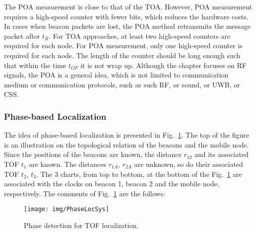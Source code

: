 The POA measurement is close to that of the TOA. However, POA measurement requires a high-speed counter with fewer bits, which reduces the hardware costs. In cases when beacon packets are lost, the POA method retransmits the message packet after $t_R$.
    For TOA approaches, at least two high-speed counters are required for each node. For POA measurement, only one high-speed counter is required for each node. The length of the counter should be long enough such that within the time $t_{OF}$ it is not wrap up.
    Although the chapter focuses on RF signals, the POA is a general idea, which is not limited to communication medium or communication protocols, such as such RF, or sound, or UWB, or CSS.

\subsubsection{Phase-based Localization}
The idea of phase-based localization is presented in Fig.~\ref{f:tof}.
    The top of the figure is an illustration on the topological relation of the beacons and the mobile node. Since the positions of the beacons are known, the distance $r_{12}$ and its associated TOF $t_1$ are known. The distances $r_{1A}$, $r_{2A}$ are unknown, so do their associated TOF $t_2$, $t_3$. The 3 charts, from top to bottom, at the bottom of the Fig.~\ref{f:tof} are associated with the clocks on beacon 1, beacon 2 and the mobile node, respectively.
        The comments of Fig.~\ref{f:tof} are the follows:

\begin{figure}
    \centering
  \texttt{[image: img/PhaseLocSys]}\\
  \caption{Phase detection for TOF localization.}\label{f:tof}
\end{figure}



